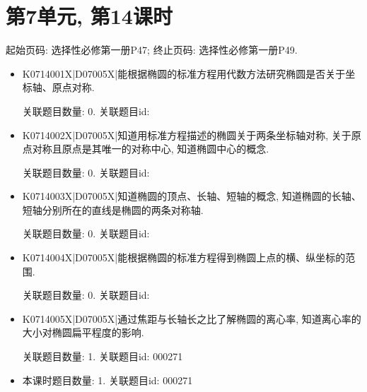 \section*{第7单元, 第14课时}
起始页码: 选择性必修第一册P47; 终止页码: 选择性必修第一册P49.
\begin{itemize}
\item K0714001X|D07005X|能根据椭圆的标准方程用代数方法研究椭圆是否关于坐标轴、原点对称.

关联题目数量: 0. 关联题目id: 

\item K0714002X|D07005X|知道用标准方程描述的椭圆关于两条坐标轴对称, 关于原点对称且原点是其唯一的对称中心, 知道椭圆中心的概念.

关联题目数量: 0. 关联题目id: 

\item K0714003X|D07005X|知道椭圆的顶点、长轴、短轴的概念, 知道椭圆的长轴、短轴分别所在的直线是椭圆的两条对称轴.

关联题目数量: 0. 关联题目id: 

\item K0714004X|D07005X|能根据椭圆的标准方程得到椭圆上点的横、纵坐标的范围.

关联题目数量: 0. 关联题目id: 

\item K0714005X|D07005X|通过焦距与长轴长之比了解椭圆的离心率, 知道离心率的大小对椭圆扁平程度的影响.

关联题目数量: 1. 关联题目id: 000271

\item 本课时题目数量: 1. 关联题目id: 000271

\end{itemize}

